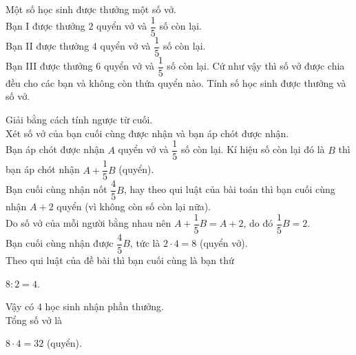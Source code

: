 \begin{bt}%
	Một số học sinh được thưởng một số vở.\\
	Bạn I được thưởng $2$ quyển vở và $\dfrac{1}{5}$ số còn lại.\\
	Bạn II được thưởng $4$ quyển vở và $\dfrac{1}{5}$ số còn lại.\\
	Bạn III được thưởng $6$ quyển vở và $\dfrac{1}{5}$ số còn lại.
	\noindent Cứ như vậy thì số vở được chia đều cho các bạn và không còn thứa quyển nào. Tính số học sinh được thưởng và số vở.
	\loigiai
	{
		Giải bằng cách tính ngược từ cuối.\\
		Xét số vở của bạn cuối cùng được nhận và bạn áp chót được nhận.\\
		Bạn áp chót được nhận $A$ quyển vở và $\dfrac{1}{5}$ số còn lại. Kí hiệu số còn lại đó là $B$ thì bạn áp chót nhận $A+\dfrac{1}{5}B$ (quyển).\\
		Bạn cuối cùng nhận nốt $\dfrac{4}{5}B$, hay theo qui luật của bài toán thì bạn cuối cùng nhận $A+2$ quyển (vì không còn số còn lại nữa).\\
		Do số vở của mỗi người bằng nhau nên $A+\dfrac{1}{5}B=A+2$, do đó $\dfrac{1}{5}B=2$.\\
		Bạn cuối cùng nhận được $\dfrac{4}{5}B$, tức là $2\cdot 4=8$ (quyển vở).\\
		Theo qui luật của đề bài thì bạn cuối cùng là bạn thứ 
		\begin{center}
			$8:2=4$.
		\end{center}
		Vậy có $4$ học sinh nhận phần thưởng.\\
		Tổng số vở là 
		\begin{center}
			$8\cdot 4=32$ (quyển).
		\end{center}
	}
\end{bt}
